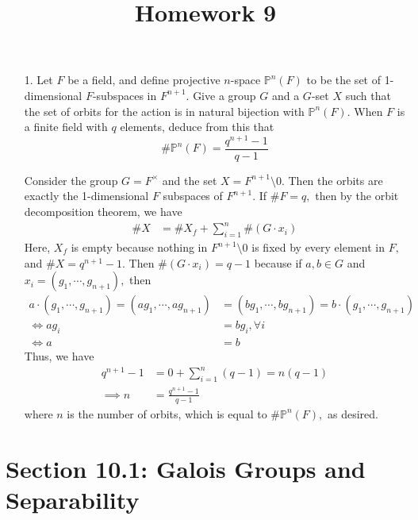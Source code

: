 \documentclass{article}
\newcommand{\PP}{\mathbb P}
\begin{document}
\title{Homework 9}
\maketitle
\thispagestyle{fancy}

\begin{itemize}
	\item[1.] Let $F$ be a field, and define projective $n$-space $\PP^n(F)$ to be the set of 1-dimensional $F$-subspaces in $F^{n+1}.$ Give a group $G$ and a $G$-set $X$ such that the set of orbits for the action is in natural bijection with $\PP^n(F).$ When $F$ is a finite field with $q$ elements, deduce from this that
		\[\# \PP^n(F)=\frac{q^{n+1}-1}{q-1}\] 
		\begin{soln}
			Consider the group $G=F^\times$ and the set $X=F^{n+1}\setminus 0.$ Then the orbits are exactly the 1-dimensional $F$ subspaces of $F^{n+1}.$ If $\# F=q,$ then by the orbit decomposition theorem, we have
			\begin{align*}
				\# X &= \# X_f + \sum_{i=1}^{n} \# (G\cdot x_i)
			\end{align*}
			Here, $X_f$ is empty because nothing in $F^{n+1}\setminus0$ is fixed by every element in $F,$ and $\# X=q^{n+1}-1.$ Then $\#(G\cdot x_i)=q-1$ because if $a, b\in G$ and $x_i=(g_1, \cdots, g_{n+1}),$ then
			\begin{align*}
				a\cdot(g_1, \cdots, g_{n+1}) = (ag_1, \cdots, ag_{n+1}) &= (bg_1, \cdots, bg_{n+1}) = b\cdot(g_1, \cdots, g_{n+1}) \\
				\iff ag_i &= bg_i, \forall i \\
				\iff a &= b
			\end{align*}
			Thus, we have
			\begin{align*}
				q^{n+1}-1 &= 0 + \sum_{i=1}^{n} (q-1) = n(q-1) \\
				\implies n &= \frac{q^{n+1}-1}{q-1}
			\end{align*}
			where $n$ is the number of orbits, which is equal to $\#\PP^n(F),$ as desired.
		\end{soln}
		
\end{itemize}

\section*{Section 10.1: Galois Groups and Separability}
\end{document}
